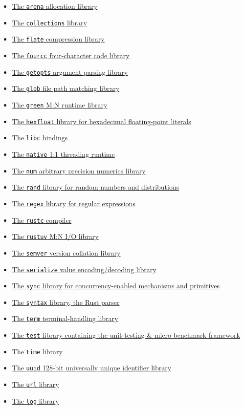 \documentclass[]{article}
\begin{document}
\begin{itemize}
\itemsep1pt\parskip0pt
\item
  \href{arena/index.html}{The \texttt{arena} allocation library}
\item
  \href{collections/index.html}{The \texttt{collections} library}
\item
  \href{flate/index.html}{The \texttt{flate} compression library}
\item
  \href{fourcc/index.html}{The \texttt{fourcc} four-character code
  library}
\item
  \href{getopts/index.html}{The \texttt{getopts} argument parsing
  library}
\item
  \href{glob/index.html}{The \texttt{glob} file path matching library}
\item
  \href{green/index.html}{The \texttt{green} M:N runtime library}
\item
  \href{hexfloat/index.html}{The \texttt{hexfloat} library for
  hexadecimal floating-point literals}
\item
  \href{libc/index.html}{The \texttt{libc} bindings}
\item
  \href{native/index.html}{The \texttt{native} 1:1 threading runtime}
\item
  \href{num/index.html}{The \texttt{num} arbitrary precision numerics
  library}
\item
  \href{rand/index.html}{The \texttt{rand} library for random numbers
  and distributions}
\item
  \href{regex/index.html}{The \texttt{regex} library for regular
  expressions}
\item
  \href{rustc/index.html}{The \texttt{rustc} compiler}
\item
  \href{rustuv/index.html}{The \texttt{rustuv} M:N I/O library}
\item
  \href{semver/index.html}{The \texttt{semver} version collation
  library}
\item
  \href{serialize/index.html}{The \texttt{serialize} value
  encoding/decoding library}
\item
  \href{sync/index.html}{The \texttt{sync} library for
  concurrency-enabled mechanisms and primitives}
\item
  \href{syntax/index.html}{The \texttt{syntax} library, the Rust parser}
\item
  \href{term/index.html}{The \texttt{term} terminal-handling library}
\item
  \href{test/index.html}{The \texttt{test} library containing the
  unit-testing \& micro-benchmark framework}
\item
  \href{time/index.html}{The \texttt{time} library}
\item
  \href{uuid/index.html}{The \texttt{uuid} 128-bit universally unique
  identifier library}
\item
  \href{url/index.html}{The \texttt{url} library}
\item
  \href{log/index.html}{The \texttt{log} library}
\end{itemize}
\end{document}
